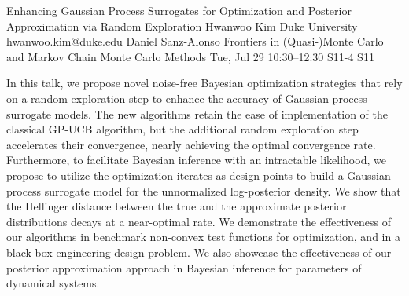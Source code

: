 \begin{talk}
  {Enhancing Gaussian Process Surrogates for Optimization and Posterior Approximation via Random Exploration}%
  {Hwanwoo Kim}%
  {Duke University}%
  {hwanwoo.kim@duke.edu}%
  {Daniel Sanz-Alonso}%
  {Frontiers in (Quasi-)Monte Carlo and Markov Chain Monte Carlo Methods}%
  {Tue, Jul 29 10:30–12:30}%
  {S11-4}%
  {S11}%
				
			
In this talk, we propose novel noise-free Bayesian optimization strategies that rely on a random exploration step to enhance the accuracy of Gaussian process surrogate models. The new algorithms retain the ease of implementation of the classical GP-UCB algorithm, but the additional random exploration step accelerates their convergence, nearly achieving the optimal convergence rate. Furthermore, to facilitate Bayesian inference with an intractable likelihood, we propose to utilize the optimization iterates as design points to build a Gaussian process surrogate model for the unnormalized log-posterior density. We show that the Hellinger distance between the true and the approximate posterior distributions decays at a near-optimal rate. We demonstrate the effectiveness of our algorithms in benchmark non-convex test functions for optimization, and in a black-box engineering design problem. We also showcase the effectiveness of our posterior approximation approach in Bayesian inference for parameters of dynamical systems.


\end{talk}

